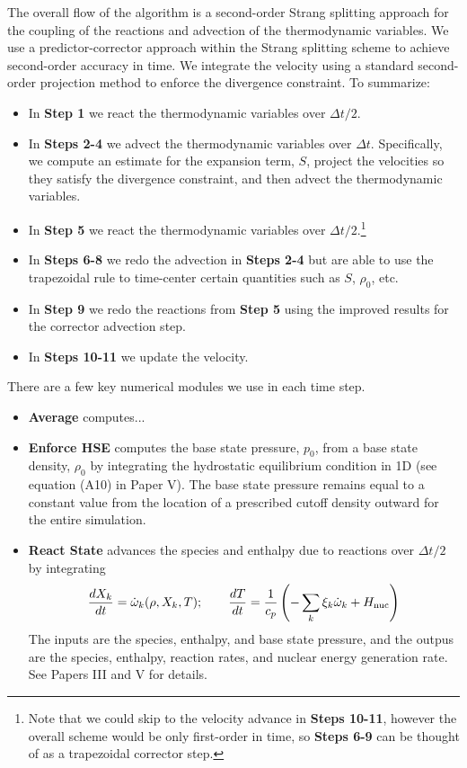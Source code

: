 \documentclass{aastex62}
\begin{document}
The overall flow of the algorithm is a second-order Strang splitting approach for the coupling of the reactions and advection of the thermodynamic variables.  
We use a predictor-corrector approach within the Strang splitting scheme to achieve second-order accuracy in time.
We integrate the velocity using a standard second-order projection method to enforce the divergence constraint.
To summarize:
\begin{itemize}
\item In {\bf Step 1} we react the thermodynamic variables over $\Delta t/2$.
\item In {\bf Steps 2-4} we advect the thermodynamic variables over $\Delta t$.  Specifically, we compute an estimate for the expansion term, $S$, project the velocities so they satisfy the divergence constraint, and then advect the thermodynamic variables.
\item In {\bf Step 5} we react the thermodynamic variables over $\Delta t/2$.\footnote{Note that we could skip to the velocity advance in {\bf Steps 10-11}, however the overall scheme would be only first-order in time, so {\bf Steps 6-9} can be thought of as a trapezoidal corrector step.}
\item In {\bf Steps 6-8} we redo the advection in {\bf Steps 2-4} but are able to use the trapezoidal rule to time-center certain quantities such as $S$, $\rho_0$, etc.
\item In {\bf Step 9} we redo the reactions from {\bf Step 5} using the improved results for the corrector advection step.
\item In {\bf Steps 10-11} we update the velocity.
\end{itemize}

There are a few key numerical modules we use in each time step.
\begin{itemize}
\item {\bf Average} computes...
\item {\bf Enforce HSE} computes the base state pressure, $p_0$, from a base state density, $\rho_0$ by integrating the hydrostatic equilibrium condition in 1D (see equation (A10) in Paper V).  The base state pressure remains equal to a constant value from the location of a prescribed cutoff density outward for the entire simulation.
\item {\bf React State} advances the species and enthalpy due to reactions over $\Delta t/2$ by integrating
\begin{equation}
\frac{dX_k}{dt} = \dot\omega_k(\rho,X_k,T); \qquad
\frac{dT}{dt} = \frac{1}{c_p}\left(-\sum_k\xi_k\dot\omega_k + H_{\rm nuc}\right)
\end{equation}
The inputs are the species, enthalpy, and base state pressure, and the outpus are the species, enthalpy, reaction rates, and nuclear energy generation rate.
See Papers III and V for details.
\end{itemize}
\end{document}
